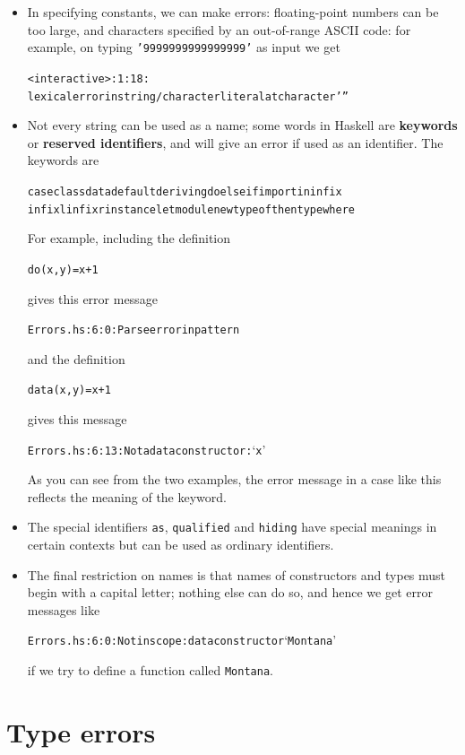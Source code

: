 \begin{itemize}
\item
In specifying constants, we can make errors: floating-point numbers can be
too large, and characters specified by an out-of-range ASCII code: for example, on typing \texttt{'\bs{}9999999999999999'} as input we get
\begin{alltt}
<interactive>:1:18:
    lexical error in string/character literal at character '\bs{}''
    \end{alltt}

\item
Not every string can be used as a name; some words in Haskell are
\textbf{keywords} or \textbf{reserved identifiers},
and will give an error if used as an identifier. The keywords
are
\begin{alltt}
case class data default deriving do else if import in infix
infixl infixr instance let module newtype of then type where
\end{alltt}
For example, including the definition 
\begin{alltt}
do (x,y) = x+1
\end{alltt}
gives this error message
\begin{alltt}
Errors.hs:6:0: Parse error in pattern
\end{alltt}
and the definition
\begin{alltt}
data (x,y) = x+1
\end{alltt}
gives this message
\begin{alltt}
Errors.hs:6:13: Not a data constructor: `x'
\end{alltt}
As you can see from the two examples, the error message in a case like this reflects the  meaning of the keyword.

\item
The special identifiers \texttt{as}, \texttt{qualified} and
\texttt{hiding} have special meanings in certain contexts but can be
used as ordinary identifiers.

\item
The final restriction on names is that names of constructors and types
must begin with a
capital letter; nothing else can do so, and hence we get error messages like
\begin{alltt}
Errors.hs:6:0: Not in scope: data constructor `Montana'
\end{alltt}
if we try to define a function called \texttt{Montana}.
\end{itemize}

\section*{Type errors}

